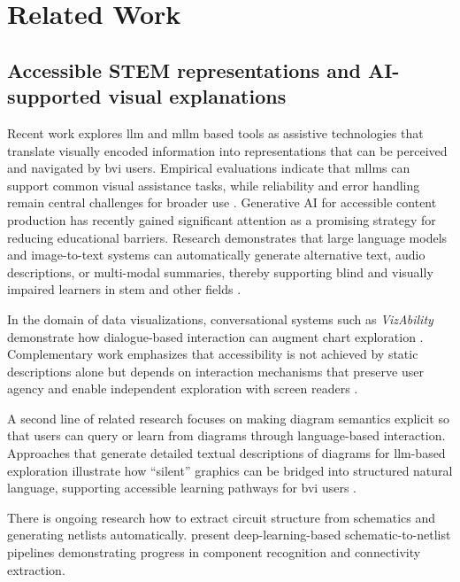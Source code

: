 \section{Related Work}

\subsection{Accessible STEM representations and AI-supported visual explanations}

Recent work explores \ac{llm} and \ac{mllm} based tools as assistive technologies that translate visually encoded information into representations that can be perceived and navigated by \ac{bvi} users. Empirical evaluations indicate that \ac{mllm}s can support common visual assistance tasks, while reliability and error handling remain central challenges for broader use \cite{Karamolegkou2025}. Generative AI for accessible content production has recently gained significant attention as a promising strategy for reducing educational barriers. Research demonstrates that large language models and image-to-text systems can automatically generate alternative text, audio descriptions, or multi-modal summaries, thereby supporting blind and visually impaired learners in \ac{stem} and other fields \cite{Karamolegkou2025,Schauer2025}.

In the domain of data visualizations, conversational systems such as \textit{VizAbility} demonstrate how dialogue-based interaction can augment chart exploration \cite{Gorniak2024VizAbility}. Complementary work emphasizes that accessibility is not achieved by static descriptions alone but depends on interaction mechanisms that preserve user agency and enable independent exploration with screen readers \cite{Sharif2025VoxEx}.

A second line of related research focuses on making diagram semantics explicit so that users can query or learn from diagrams through language-based interaction. Approaches that generate detailed textual descriptions of diagrams for \ac{llm}-based exploration illustrate how ``silent'' graphics can be bridged into structured natural language, supporting accessible learning pathways for \ac{bvi} users \cite{Wegwerth2023Diagram}.

There is ongoing research how to extract circuit structure from schematics and generating netlists automatically. \cite{Hemker2024Schematics,Huang2025Netlistify} present deep-learning-based schematic-to-netlist pipelines demonstrating progress in component recognition and connectivity extraction.

